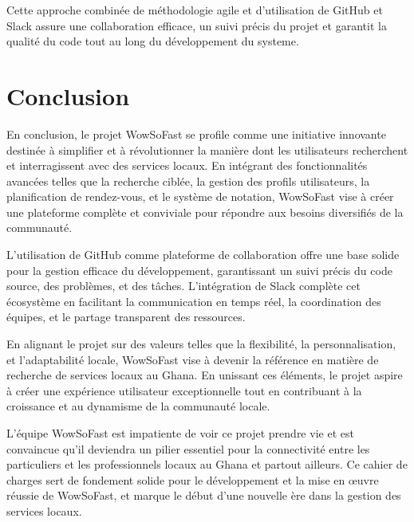 {Cette approche combinée de méthodologie agile et d'utilisation de GitHub et Slack assure une collaboration efficace, un suivi précis du projet et garantit la qualité du code tout au long du développement du systeme.

\vspace{1.5cm}

\section*{Conclusion}

En conclusion, le projet WowSoFast se profile comme une initiative innovante destinée à simplifier et à révolutionner la manière dont les utilisateurs recherchent et interragissent avec des services locaux. En intégrant des fonctionnalités avancées telles que la recherche ciblée, la gestion des profils utilisateurs, la planification de rendez-vous, et le système de notation, WowSoFast vise à créer une plateforme complète et conviviale pour répondre aux besoins diversifiés de la communauté.

\vspace{0.5cm}

L'utilisation de GitHub comme plateforme de collaboration offre une base solide pour la gestion efficace du développement, garantissant un suivi précis du code source, des problèmes, et des tâches. L'intégration de Slack complète cet écosystème en facilitant la communication en temps réel, la coordination des équipes, et le partage transparent des ressources.

\vspace{0.5cm}

En alignant le projet sur des valeurs telles que la flexibilité, la personnalisation, et l'adaptabilité locale, WowSoFast vise à devenir la référence en matière de recherche de services locaux au Ghana. En unissant ces éléments, le projet aspire à créer une expérience utilisateur exceptionnelle tout en contribuant à la croissance et au dynamisme de la communauté locale.

\vspace{0.5cm}

L'équipe WowSoFast est impatiente de voir ce projet prendre vie et est convaincue qu'il deviendra un pilier essentiel pour la connectivité entre les particuliers et les professionnels locaux au Ghana et partout ailleurs. Ce cahier de charges sert de fondement solide pour le développement et la mise en œuvre réussie de WowSoFast, et marque le début d'une nouvelle ère dans la gestion des services locaux.

}
